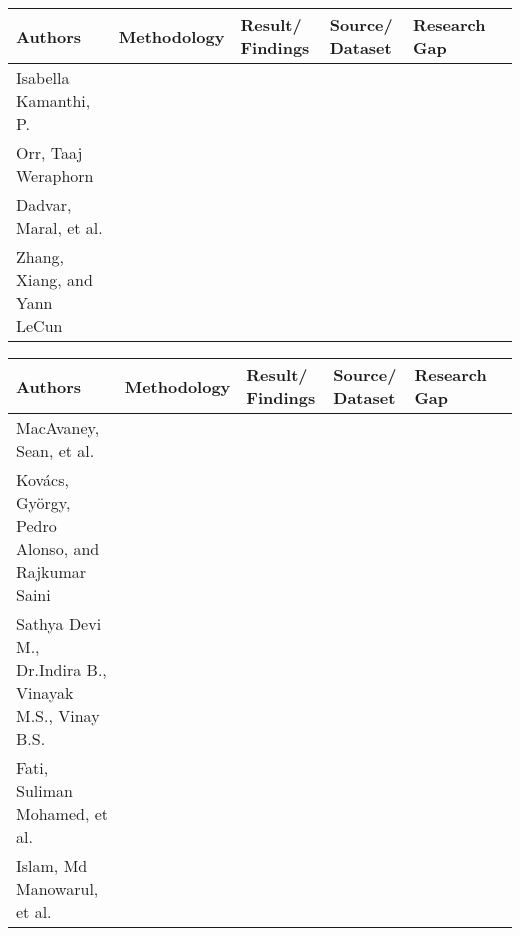 \bigskip
{
\scriptsize
\begin{tabular}{|p{1.5cm}|p{2.5cm}|p{2.5cm}|p{2.5cm}|p{2.5cm}|p{2.5cm}|}
\hline
\textbf{Authors} & \textbf{Methodology} & \textbf{Result/ Findings} & \textbf{Source/ Dataset} & \textbf{Research Gap} \\
\hline
Isabella Kamanthi, P. \cite{bib7} &  &  &  &  \\
\hline
Orr, Taaj Weraphorn \cite{bib1} &  &  &  &  \\
\hline
Dadvar, Maral, et al. \cite{bib2} &  &  &  &  \\
\hline
Zhang, Xiang, and Yann LeCun \cite{bib3} &  &  &  &  \\
\hline
\end{tabular}

\begin{tabular}{|p{1.5cm}|p{2.5cm}|p{2.5cm}|p{2.5cm}|p{2.5cm}|p{2.5cm}|}
\hline
\textbf{Authors} & \textbf{Methodology} & \textbf{Result/ Findings} & \textbf{Source/ Dataset} & \textbf{Research Gap} \\
\hline
MacAvaney, Sean, et al. \cite{bib5} &  &  &  &  \\
\hline
Kovács, György, Pedro Alonso, and Rajkumar Saini \cite{bib6} &  &  &  &  \\
\hline
Sathya Devi M., Dr.Indira B., Vinayak M.S., Vinay B.S. \cite{bib4} &  &  &  &  \\
\hline
Fati, Suliman Mohamed, et al. \cite{bib9} &  &  &  &  \\
\hline
Islam, Md Manowarul, et al. \cite{bib10} &  &  &  &  \\
\hline
\end{tabular}

}

